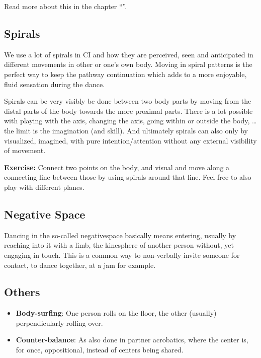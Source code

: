 Read more about this in the chapter ``''.

\subsection{Spirals}\label{subsec:spirals}

We use a lot of spirals in CI and how they are perceived, seen and anticipated in different movements in other or one's own body.
Moving in spiral patterns is the perfect way to keep the pathway continuation which adds to a more enjoyable, fluid sensation during the dance.

Spirals can be very visibly be done between two body parts by moving from the distal parts of the body towards the more proximal parts.
There is a lot possible with playing with the axis, changing the axis, going within or outside the body, \ldots the limit is the imagination (and skill).
And ultimately spirals can also only by visualized, imagined, with pure intention/attention without any external visibility of movement.

\textbf{Exercise:} Connect two points on the body, and visual and move along a connecting line between those by using spirals around that line.
Feel free to also play with different planes.

\subsection{Negative Space}\label{subsec:negative-space}

Dancing in the so-called \gls{negativespace} basically means entering, usually by reaching into it with a limb, the \gls{kinesphere} of another person without, yet engaging in touch.
This is a common way to non-verbally invite someone for contact, to dance together, at a jam for example.

\subsection{Others}\label{subsec:others}

\begin{itemize}
    \item \textbf{Body-surfing}: One person rolls on the floor, the other (usually) perpendicularly rolling over.
    \item \textbf{Counter-balance}: As also done in partner acrobatics, where the center is, for once, oppositional, instead of centers being shared.
\end{itemize}
